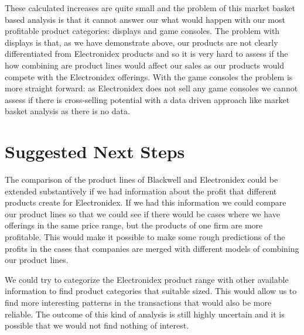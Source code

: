 \documentclass[12pt,a4paper,leqno]{report}
\theoremstyle{plain}
\theoremstyle{definition}
\theoremstyle{remark}
\begin{document}
These calculated increases are quite small and the problem of this market basket based analysis
is that it cannot answer our what would happen with our most profitable product categories: displays
and game consoles. The problem with displays is that, as we have demonstrate above, our products
are not clearly differentiated from Electronidex products and so it is very hard to assess if the
how combining are product lines would affect our sales as our products would compete with the
Electronidex offerings. With the game consoles the problem is more straight forward: as
Electronidex does not sell any game consoles we cannot assess if there is cross-selling
potential with a data driven approach like market basket analysis as there is no data.


\section{Suggested Next Steps}

The comparison of the product lines of Blackwell and Electronidex could be extended substantively if we had
information about the profit that different products create for Electronidex. If we had this information
we could compare our product lines so that we could see if there would be cases where we have offerings
in the same price range, but the products of one firm are more profitable. This would make it possible
to make some rough predictions of the profits in the cases that companies are merged with different
models of combining our product lines.

We could try to categorize the Electronidex product range with other available information to find product
categories that suitable sized. This would allow us to find more interesting patterns in the transactions
that would also be more reliable. The outcome of this kind of analysis is still highly uncertain and it is possible
that we would not find nothing of interest.
\end{document}
